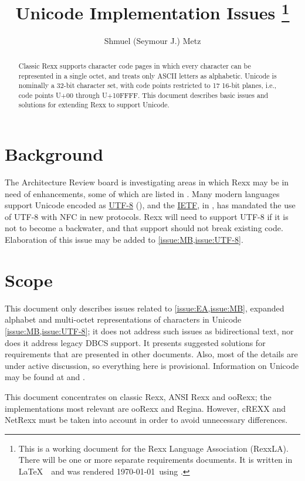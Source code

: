 \documentclass[b4paper]{article}
\title{Unicode Implementation Issues%
  \thanks
    {
    This is a working document for the Rexx Language Association (RexxLA).
    There will be one or more separate requirements documents.
    It is written in \LaTeX\ \fmtversion\ and was rendered \today\ using \enginedetails.
    }
  }
\author{Shmuel (Seymour J.) Metz}
\begin{document}

\maketitle

\begin{abstract}
Classic Rexx supports character code pages in which every character can be represented in a single octet,
and treats only ASCII letters as alphabetic.
Unicode is nominally a 32-bit character set, with code points restricted to 17 16-bit planes,
i.e., code points U+00 through U+10FFFF.
This document describes basic issues and solutions for extending Rexx to support Unicode.
\end{abstract}

\tableofcontents


\section{Background}
The Architecture Review board is investigating areas in which Rexx may be
in need of enhancements, some of which are listed in \cite{ARB:Issues}.
Many modern languages support Unicode encoded as
\href{https://datatracker.ietf.org/doc/rfc3629/}{UTF-8} (\cite{RFC:3629}),
and the \href{https://www.ietf.org/}{IETF}, in \cite{RFC:5198},
has mandated the use of UTF-8 with NFC in new protocols.
Rexx will need to support UTF-8 if it is not to become a backwater,
and that support should not break existing code.
Elaboration of this issue may be added to \cite{ARB:Issues} \cref{issue:MB,issue:UTF-8}.


\section{Scope}
This document only describes issues related to \cref{issue:EA,issue:MB}, expanded alphabet and
multi-octet representations of characters in Unicode \cref{issue:MB,issue:UTF-8}; it does not
address such issues as bidirectional text, nor does it address legacy
DBCS support. It presents suggested solutions for requirements that
are presented in other documents.  Also, most of the details are under
active discussion, so everything here is provisional.
Information on Unicode may be found at  and .

This document concentrates on classic Rexx, ANSI Rexx and ooRexx; the
implementations most relevant are ooRexx and Regina.  However, cREXX
and NetRexx must be taken into account in order to avoid unnecessary
differences.
\end{document}
